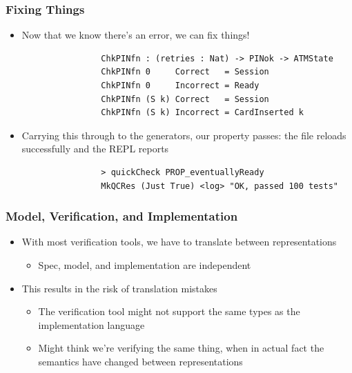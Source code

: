 \documentclass[compress]{beamer}
\begin{document}
\begin{frame}[fragile]
  \frametitle{Fixing Things}

  \large

  \begin{itemize}
    \item<1-> Now that we know there's an error, we can fix things!
              \begin{verbatim}
                ChkPINfn : (retries : Nat) -> PINok -> ATMState
                ChkPINfn 0     Correct   = Session
                ChkPINfn 0     Incorrect = Ready
                ChkPINfn (S k) Correct   = Session
                ChkPINfn (S k) Incorrect = CardInserted k
              \end{verbatim}

    \item<2-> Carrying this through to the generators, our property passes: the
              file reloads successfully and the REPL reports
              \begin{verbatim}
                > quickCheck PROP_eventuallyReady
                MkQCRes (Just True) <log> "OK, passed 100 tests"
              \end{verbatim}
  \end{itemize}

  \vspace*{-5mm}

\end{frame}


\begin{frame}

  \large

  \frametitle{Model, Verification, and Implementation}
  \begin{itemize}
    \item<1-> With most verification tools, we have to translate between
              representations
    \begin{itemize}
      \item<1-> Spec, model, and implementation are independent
    \end{itemize}
    \item<2-> This results in the risk of translation mistakes
    \begin{itemize}
      \item<3-> The verification tool might not support the same types as the
                implementation language
      \item<4-> Might think we're verifying the same thing, when in actual fact
                the semantics have changed between representations
    \end{itemize}
  \end{itemize}

\end{frame}
\end{document}
